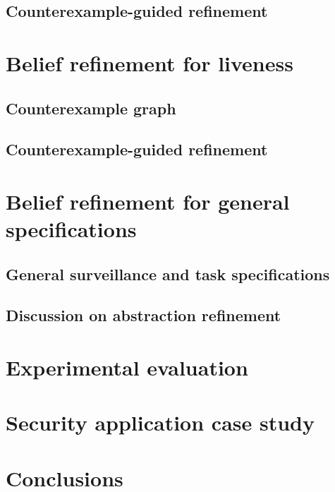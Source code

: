 \subsection{Counterexample-guided refinement}

%
%
\section{Belief refinement for liveness}%
\subsection{Counterexample graph}

\subsection{Counterexample-guided refinement}

%
%
\section{Belief refinement for general specifications}%
%
\subsection{General surveillance and task specifications}

\subsection{Discussion on abstraction refinement}

%
\section{Experimental evaluation}\label{sec:experiments}

%
%
\section{Security application case study}
%


%
%
%
\section{Conclusions}


